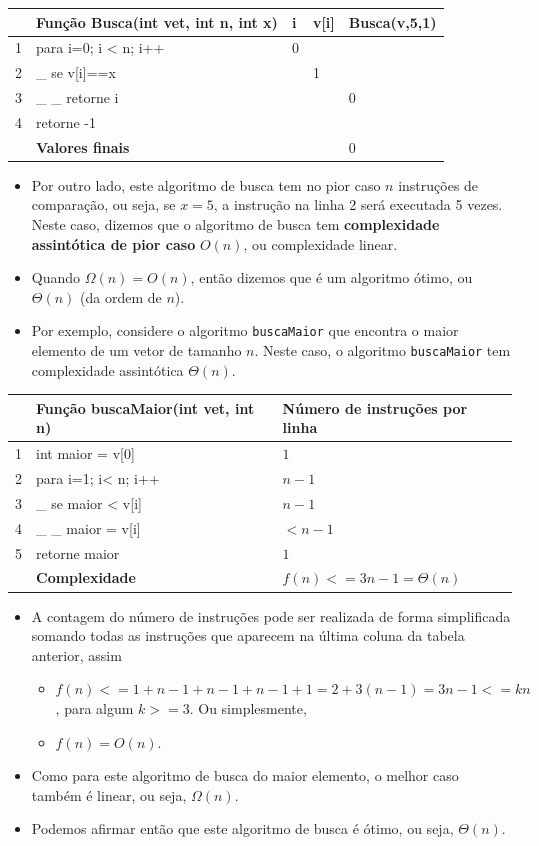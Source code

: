 \documentclass[12pt,a4paper]{article}
\providecommand{\tightlist}{%
      \setlength{\itemsep}{0pt}\setlength{\parskip}{0pt}}
\begin{document}
    \begin{longtable}[]{@{}lllll@{}}
\toprule
& Função Busca(int vet, int n, int x) & i & v{[}i{]} &
Busca(v,5,1)\tabularnewline
\midrule
\endhead
1 & para i=0; i \textless{} n; i++ & 0 & &\tabularnewline
2 & \_ se v{[}i{]}==x & & 1 &\tabularnewline
3 & \_ \_ retorne i & & & 0\tabularnewline
4 & retorne -1 & & &\tabularnewline
& \textbf{Valores finais} & & & 0\tabularnewline
\bottomrule
\end{longtable}

    \begin{itemize}
\item
  Por outro lado, este algoritmo de busca tem no pior caso \(n\)
  instruções de comparação, ou seja, se \(x=5\), a instrução na linha 2
  será executada 5 vezes. Neste caso, dizemos que o algoritmo de busca
  tem \textbf{complexidade assintótica de pior caso} \(O(n)\), ou
  complexidade linear.
\item
  Quando \(\Omega(n)=O(n)\), então dizemos que é um algoritmo ótimo, ou
  \(\Theta(n)\) (da ordem de \(n\)).
\item
  Por exemplo, considere o algoritmo \texttt{buscaMaior} que encontra o
  maior elemento de um vetor de tamanho \(n\). Neste caso, o algoritmo
  \texttt{buscaMaior} tem complexidade assintótica \(\Theta(n)\).
\end{itemize}

    \begin{longtable}[]{@{}lll@{}}
\toprule
& Função buscaMaior(int vet, int n) & Número de instruções por
linha\tabularnewline
\midrule
\endhead
1 & int maior = v{[}0{]} & \(1\)\tabularnewline
2 & para i=1; i\textless{} n; i++ & \(n-1\)\tabularnewline
3 & \_ se maior \textless{} v{[}i{]} & \(n-1\)\tabularnewline
4 & \_ \_ maior = v{[}i{]} & \(< n-1\)\tabularnewline
5 & retorne maior & \(1\)\tabularnewline
& \textbf{Complexidade} & \(f(n) <= 3n-1 = \Theta(n)\)\tabularnewline
\bottomrule
\end{longtable}

    \begin{itemize}
\item
  A contagem do número de instruções pode ser realizada de forma
  simplificada somando todas as instruções que aparecem na última coluna
  da tabela anterior, assim

  \begin{itemize}
  \tightlist
  \item
    \(f(n) <= 1 + n-1 + n-1 + n-1 + 1 = 2 + 3(n-1) = 3n -1 <= kn\), para
    algum \(k>=3\). Ou simplesmente,
  \item
    \(f(n) = O(n)\).
  \end{itemize}
\item
  Como para este algoritmo de busca do maior elemento, o melhor caso
  também é linear, ou seja, \(\Omega(n)\).
\item
  Podemos afirmar então que este algoritmo de busca é ótimo, ou seja,
  \(\Theta(n)\).
\end{itemize}
\end{document}
